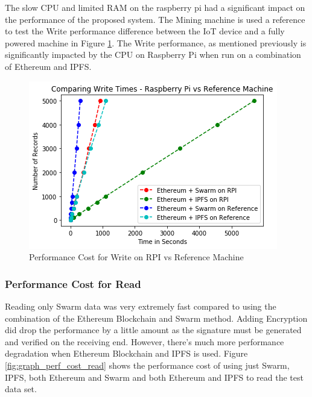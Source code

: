 \documentclass[11pt,openright]{report}
\begin{document}
\newline
The slow CPU and limited RAM on the raspberry pi had a significant impact on the performance of the proposed system. The Mining machine is used a reference to test the Write performance difference between the IoT device and a fully powered machine in Figure \ref{fig:graph_perf_cost_write_pi_ref}. The Write performance, as mentioned previously is significantly impacted by the CPU on Raspberry Pi when run on a combination of Ethereum and IPFS.
\newpage
\hfill\\
\begin{figure}[!htbp]
    \centering
    \includegraphics[scale=1]{results/graphs/WriteComp_Pi_v_Ref.png}
    \caption{Performance Cost for Write on RPI vs Reference Machine}
    \label{fig:graph_perf_cost_write_pi_ref}
\end{figure}
\newline
\newline
\subsubsection{Performance Cost for Read}
Reading only Swarm data was very extremely fast compared to using the combination of the Ethereum Blockchain and Swarm method. Adding Encryption did drop the performance by a little amount as the signature must be generated and verified on the receiving end. However, there's much more performance degradation when Ethereum Blockchain and IPFS is used. Figure \ref{fig:graph_perf_cost_read} shows the performance cost of using just Swarm, IPFS, both Ethereum and Swarm and both Ethereum and IPFS to read the test data set.
\end{document}

